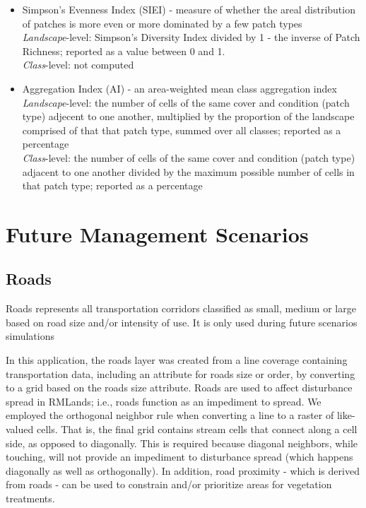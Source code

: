 \begin{itemize}
\begin{itemize}
		\item Simpson's Evenness Index (SIEI) - measure of whether the areal distribution of patches is more even or more dominated by a few patch types\\
		\emph{Landscape}-level: Simpson's Diversity Index divided by 1 - the inverse of Patch Richness; reported as a value between 0 and 1. 	\\
		\emph{Class}-level: not computed\\
		
		\item Aggregation Index (AI) - an area-weighted mean class aggregation index \\
		\emph{Landscape}-level: the number of cells of the same cover and condition (patch type) adjecent to one another, multiplied by the proportion of the landscape comprised of that that patch type, summed over all classes; reported as a percentage	\\
		\emph{Class}-level: the number of cells of the same cover and condition (patch type) adjacent to one another divided by the maximum possible number of cells in that patch type; reported as a percentage	\\
	\end{itemize}

\end{itemize}

\section{Future Management Scenarios}

\subsection{Roads} 
Roads represents all transportation corridors classified as small, medium or large based on road size and/or intensity of use. It is only used during future scenarios simulations

In this application, the roads layer was created from a line coverage containing transportation data, including an attribute for roads size or order, by converting to a grid based on the roads size attribute. Roads are used to affect disturbance spread in RMLands; i.e., roads function as an impediment to spread. We employed the orthogonal neighbor rule when converting a line to a raster of like-valued cells. That is, the final grid contains stream cells that connect along a cell side, as opposed to diagonally. This is required because diagonal neighbors, while touching, will not provide an impediment to disturbance spread (which happens diagonally as well as orthogonally). In addition, road proximity - which is derived from roads - can be used to constrain and/or prioritize areas for vegetation treatments. 

